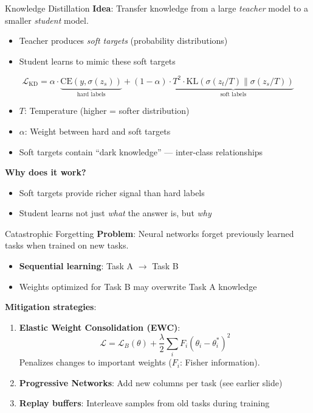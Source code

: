 \documentclass[11pt]{beamer}
\begin{document}
\begin{frame}{Knowledge Distillation}
    \textbf{Idea}: Transfer knowledge from a large \emph{teacher} model to a smaller \emph{student} model.
    \begin{itemize}
        \item Teacher produces \emph{soft targets} (probability distributions)
        \item Student learns to mimic these soft targets
    \end{itemize}
    \[
        \mathcal{L}_{\text{KD}} = \alpha \cdot \underbrace{\text{CE}(y, \sigma(z_s))}_{\text{hard labels}} + (1-\alpha) \cdot \underbrace{T^2 \cdot \text{KL}(\sigma(z_t/T) \| \sigma(z_s/T))}_{\text{soft labels}}
    \]
    \begin{itemize}
        \item $T$: Temperature (higher = softer distribution)
        \item $\alpha$: Weight between hard and soft targets
        \item Soft targets contain ``dark knowledge'' — inter-class relationships
    \end{itemize}
    \vfill
    \textbf{Why does it work?}
    \begin{itemize}
        \item Soft targets provide richer signal than hard labels
        \item Student learns not just \emph{what} the answer is, but \emph{why}
    \end{itemize}
\end{frame}

\begin{frame}{Catastrophic Forgetting}
    \textbf{Problem}: Neural networks forget previously learned tasks when trained on new tasks.
    \vspace{0.5em}
    \begin{itemize}
        \item \textbf{Sequential learning}: Task A $\to$ Task B
        \item Weights optimized for Task B may overwrite Task A knowledge
    \end{itemize}
    \vfill
    \textbf{Mitigation strategies}:
    \begin{enumerate}
        \item \textbf{Elastic Weight Consolidation (EWC)}:
        \[
            \mathcal{L} = \mathcal{L}_B(\theta) + \frac{\lambda}{2}\sum_i F_i (\theta_i - \theta^*_i)^2
        \]
        Penalizes changes to important weights ($F_i$: Fisher information).
        \item \textbf{Progressive Networks}: Add new columns per task (see earlier slide)
        \item \textbf{Replay buffers}: Interleave samples from old tasks during training
    \end{enumerate}
\end{frame}
\end{document}
